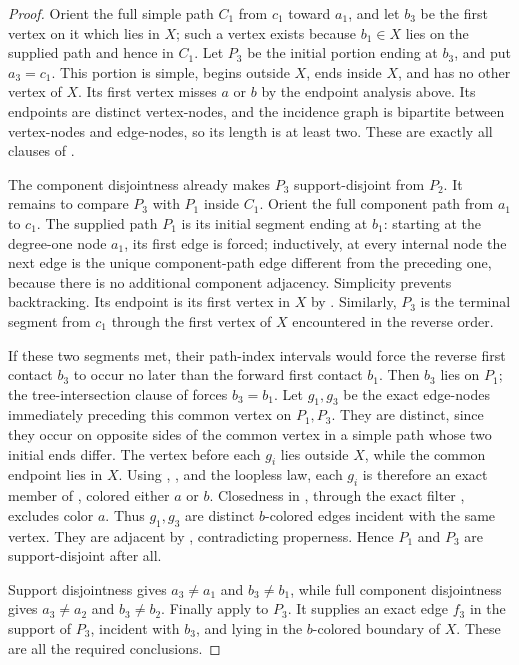\begin{proof}
Orient the full simple path $C_1$ from $c_1$ toward $a_1$, and let $b_3$
be the first vertex on it which lies in $X$; such a vertex exists because
$b_1\in X$ lies on the supplied path and hence in $C_1$.  Let $P_3$ be
the initial portion ending at $b_3$, and put $a_3=c_1$.  This portion is
simple, begins outside $X$, ends inside $X$, and has no other vertex of
$X$.  Its first vertex misses $a$ or $b$ by the endpoint analysis above.
Its endpoints are distinct vertex-nodes, and the incidence graph is
bipartite between vertex-nodes and edge-nodes, so its length is at least
two.  These are exactly all clauses of .

The component disjointness already makes $P_3$ support-disjoint from
$P_2$.  It remains to compare $P_3$ with $P_1$ inside $C_1$.  Orient the
full component path from $a_1$ to $c_1$.  The supplied path $P_1$ is its
initial segment ending at $b_1$: starting at the degree-one node $a_1$,
its first edge is forced; inductively, at every internal node the next
edge is the unique component-path edge different from the preceding one,
because there is no additional component adjacency.  Simplicity prevents
backtracking.  Its endpoint is its first vertex in $X$ by
.  Similarly, $P_3$ is the terminal segment from
$c_1$ through the first vertex of $X$ encountered in the reverse order.

If these two segments met, their path-index intervals would force the
reverse first contact $b_3$ to occur no later than the forward first
contact $b_1$.  Then $b_3$ lies on $P_1$; the tree-intersection clause of
 forces $b_3=b_1$.  Let $g_1,g_3$ be the exact
edge-nodes immediately preceding this common vertex on $P_1,P_3$.
They are distinct, since they occur on opposite sides of the common
vertex in a simple path whose two initial ends differ.  The vertex before
each $g_i$ lies outside $X$, while the common endpoint lies in $X$.
Using , , and the
loopless law, each $g_i$ is therefore an exact member of
, colored either $a$ or $b$.  Closedness in
, through the exact filter
, excludes color $a$.  Thus $g_1,g_3$ are
distinct $b$-colored edges incident with the same vertex.  They are
adjacent by , contradicting properness.  Hence
$P_1$ and $P_3$ are support-disjoint after all.

Support disjointness gives $a_3\ne a_1$ and $b_3\ne b_1$, while full
component disjointness gives $a_3\ne a_2$ and $b_3\ne b_2$.  Finally
apply  to $P_3$.  It supplies an
exact edge $f_3$ in the support of $P_3$, incident with $b_3$, and lying
in the $b$-colored boundary of $X$.  These are all the required
conclusions.
\end{proof}
